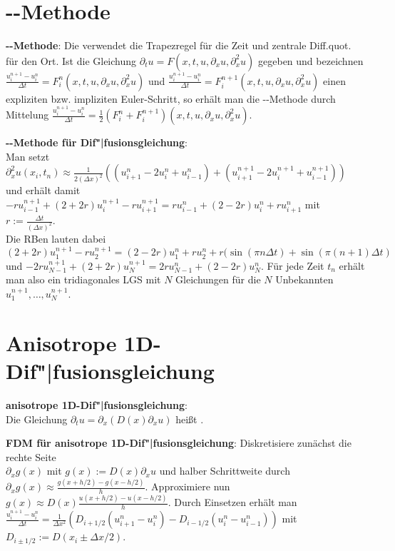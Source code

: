 \pagebreak

\section{%
    --Methode%
}

\textbf{--Methode}:
Die  verwendet
die Trapezregel für die Zeit und zentrale Diff.quot. für den Ort.
Ist die Gleichung $\partial_t u = F(x, t, u, \partial_x u, \partial_x^2 u)$ gegeben
und bezeichnen $\frac{u_i^{n+1} - u_i^n}{\Delta t} = F_i^n(x, t, u, \partial_x u, \partial_x^2 u)$
und $\frac{u_i^{n+1} - u_i^n}{\Delta t} = F_i^{n+1}(x, t, u, \partial_x u, \partial_x^2 u)$
einen expliziten bzw. impliziten Euler-Schritt, so erhält man die
--Methode durch Mittelung
$\frac{u_i^{n+1} - u_i^n}{\Delta t} =
\frac{1}{2} (F_i^n + F_i^{n+1})(x, t, u, \partial_x u, \partial_x^2 u)$.

\textbf{--Methode für Dif"|fusionsgleichung}:\\
Man setzt $\partial_x^2 u(x_i, t_n) \approx
\frac{1}{2(\Delta x)^2} ((u_{i+1}^n - 2u_i^n + u_{i-1}^n) +
(u_{i+1}^{n+1} - 2u_i^{n+1} + u_{i-1}^{n+1}))$
und erhält damit\\
$-r u_{i-1}^{n+1} + (2+2r)u_i^{n+1} - ru_{i+1}^{n+1} = ru_{i-1}^n + (2-2r)u_i^n + ru_{i+1}^n$
mit $r := \frac{\Delta t}{(\Delta x)^2}$.\\
Die RBen lauten dabei $(2+2r)u_1^{n+1} - ru_2^{n+1} = (2-2r)u_1^n + ru_2^n +
r(\sin(\pi n \Delta t) + \sin(\pi (n+1) \Delta t)$ und
$-2ru_{N-1}^{n+1} + (2+2r)u_N^{n+1} = 2ru_{N-1}^n + (2-2r)u_N^n$.
Für jede Zeit $t_n$ erhält man also ein tridiagonales LGS mit $N$ Gleichungen für die $N$
Unbekannten $u_1^{n+1}, \dotsc, u_N^{n+1}$.

\section{%
    Anisotrope 1D-Dif"|fusionsgleichung%
}

\textbf{anisotrope 1D-Dif"|fusionsgleichung}:\\
Die Gleichung $\partial_t u = \partial_x (D(x) \partial_x u)$
heißt .

\textbf{FDM für anisotrope 1D-Dif"|fusionsgleichung}:
Diskretisiere zunächst die rechte Seite\\
$\partial_x g(x)$ mit $g(x) := D(x) \partial_x u$ und halber Schrittweite
durch $\partial_x g(x) \approx \frac{g(x + h/2) - g(x - h/2)}{h}$.
Approximiere nun $g(x) \approx D(x) \frac{u(x + h/2) - u(x - h/2)}{h}$.
Durch Einsetzen erhält man\\
$\frac{u_i^{n+1} - u_i^n}{\Delta t} =
\frac{1}{\Delta x^2} (D_{i+1/2} (u_{i+1}^n - u_i^n) - D_{i-1/2} (u_i^n - u_{i-1}^n))$
mit $D_{i\pm1/2} := D(x_i \pm \Delta x/2)$.

